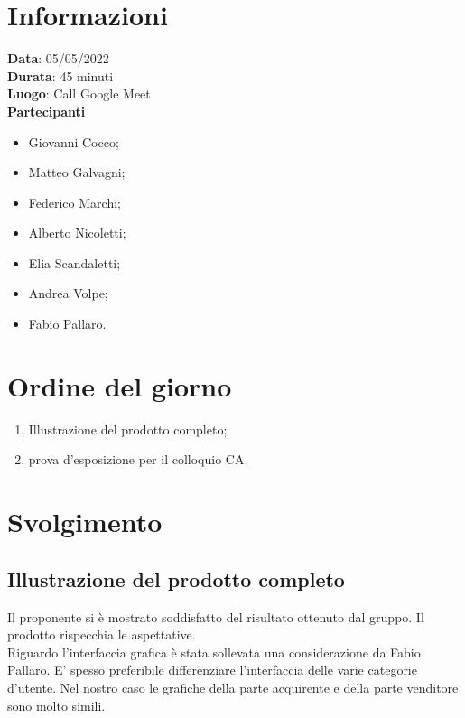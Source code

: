 \documentclass[a4paper, 12pt]{article}
\begin{document}
\makefrontpage

\section{Informazioni}
\textbf{Data}: 05/05/2022\\
\textbf{Durata}: 45 minuti\\
\textbf{Luogo}: Call Google Meet\\

\textbf{Partecipanti}
\begin{itemize}
	\item Giovanni Cocco;
	\item Matteo Galvagni;
	\item Federico Marchi;
	\item Alberto Nicoletti;
	\item Elia Scandaletti;
	\item Andrea Volpe;
	\item Fabio Pallaro.
\end{itemize}


\section{Ordine del giorno}
\begin{enumerate}
	\item Illustrazione del prodotto completo;
	\item prova d'esposizione per il colloquio CA.
\end{enumerate}

\section{Svolgimento}
\subsection{Illustrazione del prodotto completo}
Il proponente si è mostrato soddisfatto del risultato ottenuto dal gruppo. Il prodotto rispecchia le aspettative.
\\Riguardo l'interfaccia grafica è stata sollevata una considerazione da Fabio Pallaro. E' spesso preferibile differenziare l'interfaccia delle varie categorie d'utente. Nel nostro caso le grafiche della parte acquirente e della parte venditore sono molto simili.
\end{document}
